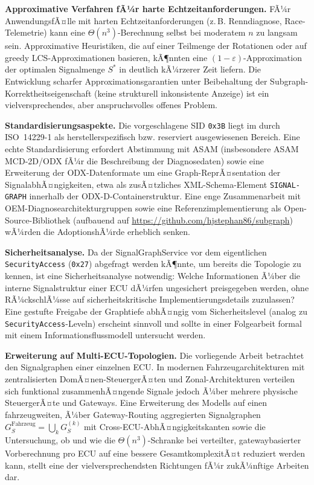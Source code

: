 ﻿\documentclass[a4paper,12pt]{article}
\theoremstyle{definition}
\begin{document}
\textbf{Approximative Verfahren fÃ¼r harte Echtzeitanforderungen.} FÃ¼r AnwendungsfÃ¤lle mit harten Echtzeitanforderungen (z.\,B. Renndiagnose, Race-Telemetrie) kann eine $\Theta(n^3)$-Berechnung selbst bei moderatem $n$ zu langsam sein. Approximative Heuristiken, die auf einer Teilmenge der Rotationen oder auf greedy LCS-Approximationen basieren, kÃ¶nnten eine $(1-\varepsilon)$-Approximation der optimalen Signalmenge $S^\ast$ in deutlich kÃ¼rzerer Zeit liefern. Die Entwicklung scharfer Approximationsgarantien unter Beibehaltung der Subgraph-Korrektheitseigenschaft (keine strukturell inkonsistente Anzeige) ist ein vielversprechendes, aber anspruchsvolles offenes Problem.

\textbf{Standardisierungsaspekte.} Die vorgeschlagene SID \texttt{0x3B} liegt im durch ISO~14229-1 als herstellerspezifisch bzw. reserviert ausgewiesenen Bereich. Eine echte Standardisierung erfordert Abstimmung mit ASAM (insbesondere ASAM MCD-2D/ODX fÃ¼r die Beschreibung der Diagnosedaten) sowie eine Erweiterung der ODX-Datenformate um eine Graph-ReprÃ¤sentation der SignalabhÃ¤ngigkeiten, etwa als zusÃ¤tzliches XML-Schema-Element \texttt{SIGNAL-GRAPH} innerhalb der ODX-D-Containerstruktur. Eine enge Zusammenarbeit mit OEM-Diagnosearchitekturgruppen sowie eine Referenzimplementierung als Open-Source-Bibliothek (aufbauend auf \url{https://github.com/hjstephan86/subgraph}) wÃ¼rden die AdoptionshÃ¼rde erheblich senken.

\textbf{Sicherheitsanalyse.} Da der SignalGraphService vor dem eigentlichen \texttt{SecurityAccess} (\texttt{0x27}) abgefragt werden kÃ¶nnte, um bereits die Topologie zu kennen, ist eine Sicherheitsanalyse notwendig: Welche Informationen Ã¼ber die interne Signalstruktur einer ECU dÃ¼rfen ungesichert preisgegeben werden, ohne RÃ¼ckschlÃ¼sse auf sicherheitskritische Implementierungsdetails zuzulassen? Eine gestufte Freigabe der Graphtiefe abhÃ¤ngig vom Sicherheitslevel (analog zu \texttt{SecurityAccess}-Leveln) erscheint sinnvoll und sollte in einer Folgearbeit formal mit einem Informationsflussmodell untersucht werden.

\textbf{Erweiterung auf Multi-ECU-Topologien.} Die vorliegende Arbeit betrachtet den Signalgraphen einer einzelnen ECU. In modernen Fahrzeugarchitekturen mit zentralisierten DomÃ¤nen-SteuergerÃ¤ten und Zonal-Architekturen verteilen sich funktional zusammenhÃ¤ngende Signale jedoch Ã¼ber mehrere physische SteuergerÃ¤te und Gateways. Eine Erweiterung des Modells auf einen fahrzeugweiten, Ã¼ber Gateway-Routing aggregierten Signalgraphen $G_S^{\text{Fahrzeug}} = \bigcup_k G_S^{(k)}$ mit Cross-ECU-AbhÃ¤ngigkeitskanten sowie die Untersuchung, ob und wie die $\Theta(n^3)$-Schranke bei verteilter, gatewaybasierter Vorberechnung pro ECU auf eine bessere GesamtkomplexitÃ¤t reduziert werden kann, stellt eine der vielversprechendsten Richtungen fÃ¼r zukÃ¼nftige Arbeiten dar.
\end{document}
